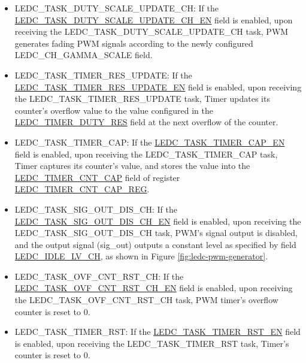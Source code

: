 \documentclass[main\_\_EN.tex]{subfiles}
\begin{document}
\begin{itemize}
\item LEDC\_TASK\_DUTY\_SCALE\_UPDATE\_CH: If the \hyperref[fielddesc:LEDCTASKDUTYSCALEUPDATECHNEN]{LEDC\_TASK\_DUTY\_SCALE\_UPDATE\_CH\_EN} field is enabled, upon receiving the LEDC\_TASK\_DUTY\_SCALE\_UPDATE\_CH task, PWM generates fading PWM signals according to the newly configured LEDC\_CH\_GAMMA\_SCALE field.
\item LEDC\_TASK\_TIMER\_RES\_UPDATE: If the \hyperref[fielddesc:LEDCTASKTIMERNRESUPDATEEN]{LEDC\_TASK\_TIMER\_RES\_UPDATE\_EN} field is enabled, upon receiving the LEDC\_TASK\_TIMER\_RES\_UPDATE task, Timer updates its counter's overflow value to the value configured in the \hyperref[fielddesc:LEDCTIMERNDUTYRES]{LEDC\_TIMER\_DUTY\_RES} field at the next overflow of the counter.
\item LEDC\_TASK\_TIMER\_CAP: If the \hyperref[fielddesc:LEDCTASKTIMERNCAPEN]{LEDC\_TASK\_TIMER\_CAP\_EN} field is enabled, upon receiving the LEDC\_TASK\_TIMER\_CAP task, Timer captures its counter's value, and stores the value into the \hyperref[fielddesc:LEDCTIMERNCNTCAP]{LEDC\_TIMER\_CNT\_CAP} field of register \hyperref[regdesc:LEDCTIMERNCNTCAPREG]{LEDC\_TIMER\_CNT\_CAP\_REG}.
\item LEDC\_TASK\_SIG\_OUT\_DIS\_CH: If the \hyperref[fielddesc:LEDCTASKSIGOUTDISCHNEN]{LEDC\_TASK\_SIG\_OUT\_DIS\_CH\_EN} field is enabled, upon receiving the LEDC\_TASK\_SIG\_OUT\_DIS\_CH task, PWM's signal output is disabled, and the output signal (sig\_out) outputs a constant level as specified by field \hyperref[fielddesc:LEDCIDLELVCHN]{LEDC\_IDLE\_LV\_CH}, as shown in Figure \ref{fig:ledc-pwm-generator}.
\item LEDC\_TASK\_OVF\_CNT\_RST\_CH: If the \hyperref[fielddesc:LEDCTASKOVFCNTRSTCHNEN]{LEDC\_TASK\_OVF\_CNT\_RST\_CH\_EN} field is enabled, upon receiving the LEDC\_TASK\_OVF\_CNT\_RST\_CH task, PWM timer's overflow counter is reset to 0.
\item LEDC\_TASK\_TIMER\_RST: If the \hyperref[fielddesc:LEDCTASKTIMERNRSTEN]{LEDC\_TASK\_TIMER\_RST\_EN} field is enabled, upon receiving the LEDC\_TASK\_TIMER\_RST task, Timer's counter is reset to 0. 

\end{itemize}
\end{document}
